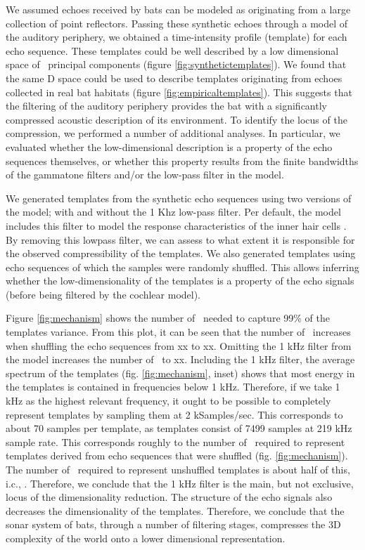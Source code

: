 \documentclass[preprint,5p]{elsarticle}
\begin{document}
We assumed echoes received by bats can be modeled as originating from a large collection of point reflectors. Passing these synthetic echoes through a model of the auditory periphery, we obtained a time-intensity profile (template) for each echo sequence. These templates could be well described by a low dimensional space of \pca\ principal components (figure \ref{fig:synthetictemplates}). We found that the same \pca D space could be used to describe templates originating from echoes collected in real bat habitats (figure \ref{fig:empiricaltemplates}). This suggests that the filtering of the auditory periphery provides the bat with a significantly compressed acoustic description of its environment. To identify the locus of the compression, we performed a number of additional analyses. In particular, we evaluated whether the low-dimensional description is a property of the echo sequences themselves, or whether this property results from the finite bandwidths of the gammatone filters and/or the low-pass filter in the \citet{Wiegrebe2008} model.

We generated templates from the synthetic echo sequences using two versions of the \citet{Wiegrebe2008} model; with and without the 1 Khz low-pass filter. Per default, the model includes this filter to model the response characteristics of the inner hair cells \citep{Meddis2006,Reijniers2010a}. By removing this lowpass filter, we can assess to what extent it is responsible for the observed compressibility of the templates. We also generated templates using echo sequences of which the samples were randomly shuffled. This allows inferring whether the low-dimensionality of the templates is a property of the echo signals (before being filtered by the cochlear model). 

Figure \ref{fig:mechanism} shows the number of \pcs\ needed to capture 99\% of the templates variance. From this plot, it can be seen that the number of \pcs\ increases when shuffling the echo sequences from xx to xx. Omitting the 1 kHz filter from the  \citet{Wiegrebe2008} model increases the number of \pcs\ to xx. Including the 1 kHz filter, the average spectrum of the templates (fig. \ref{fig:mechanism}, inset) shows that most energy in the templates is contained in frequencies below 1 kHz. Therefore, if we take 1 kHz as the highest relevant frequency, it ought to be possible to completely represent templates by sampling them at 2 kSamples/sec. This corresponds to about 70 samples per template, as templates consist of 7499 samples at 219 kHz sample rate. This corresponds roughly to the number of \pcs\ required to represent templates derived from echo sequences that were shuffled  (fig. \ref{fig:mechanism}). The number of \pcs\ required to represent unshuffled templates is about half of this, i.c., \pca. Therefore, we conclude that the 1 kHz filter is the main, but not exclusive, locus of the dimensionality reduction. The structure of the echo signals also decreases the dimensionality of the templates. Therefore, we conclude that the sonar system of bats, through a number of filtering stages, compresses the 3D complexity of the world onto a lower dimensional representation.
\end{document}
